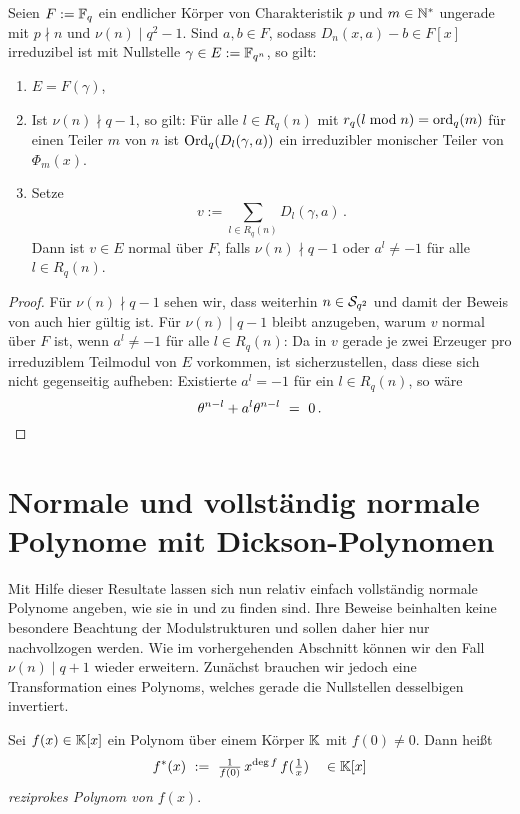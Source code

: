 \begin{satz}
  \label{satz:scheerhorn_erweitert}
  Seien $F := \F_q$ ein endlicher Körper von Charakteristik $p$ und $m\in
  \N^\ast$ ungerade mit $p\nmid n$ und $\nu(n)\mid q^2-1$. Sind $a,b\in F$, 
  sodass $D_n(x,a)-b \in F[x]$ irreduzibel ist mit Nullstelle $\gamma \in E:=
  \F_{q^n}$, so gilt:
  \begin{enumerate}
    \item $E = F(\gamma)$,
    \item Ist $\nu(n)\nmid q-1$, so gilt:
      Für alle $l\in R_q(n)$ mit $r_q(l\bmod n) = \ord_q(m)$ 
      für einen Teiler $m$ von $n$ ist 
      $\Ord_q(D_l(\gamma,a))$ ein irreduzibler monischer Teiler von
      $\Phi_m(x)$.
    \item Setze 
      \[ v := \sum_{l\in R_q(n)} D_l(\gamma,a)\,. \]
      Dann ist $v \in E$ normal über $F$, falls
      $\nu(n)\nmid q-1$ oder $a^l\neq -1$ für alle $l \in R_q(n)$.
  \end{enumerate}
\end{satz}
\begin{proof}
  Für $\nu(n)\nmid q-1$ 
  sehen wir, dass weiterhin $n\in \S_{q^2}$ und damit der Beweis 
  von  auch hier gültig ist.
  Für $\nu(n)\mid q-1$ bleibt anzugeben, warum $v$ normal über $F$ ist, wenn
  $a^l\neq -1$ für alle $l\in R_q(n)$:
  Da in $v$ gerade je zwei Erzeuger pro irreduziblem Teilmodul von $E$
  vorkommen, ist sicherzustellen, dass diese sich nicht gegenseitig aufheben:
  Existierte $a^l = -1$ für ein $l\in R_q(n)$, so wäre
  \[ \theta^{n-l} + a^l\theta^{n-l} \speq= 0\,.\]
\end{proof}


\section{Normale und vollständig normale Polynome mit
  Dickson-Poly\-nomen}

Mit Hilfe dieser Resultate lassen sich nun relativ einfach vollständig normale
Polynome angeben, wie sie in \autocite[Section 3]{scheerhorn:1997} und 
\autocite[Section 4]{scheerhorn:1996} zu finden sind. Ihre Beweise beinhalten
keine besondere Beachtung der Modulstrukturen und sollen daher hier nur
nachvollzogen werden. Wie im vorhergehenden Abschnitt können wir den Fall
$\nu(n)\mid q+1$ wieder erweitern.
Zunächst brauchen wir jedoch eine Transformation eines Polynoms, welches gerade
die Nullstellen desselbigen invertiert.

\begin{definition}
  \label{def:reziprokes_polynom}
  Sei $f(x) \in \K[x]$ ein Polynom über einem Körper $\K$ mit 
  $f(0)\neq 0$. Dann heißt
  \[ f^\ast(x) \speq{:=} \tfrac{1}{f(0)}\, x^{\deg f}\, f(\tfrac 1 x)
    \quad \in \K[x] \]
  \emph{reziprokes Polynom von $f(x)$}.
\end{definition}

